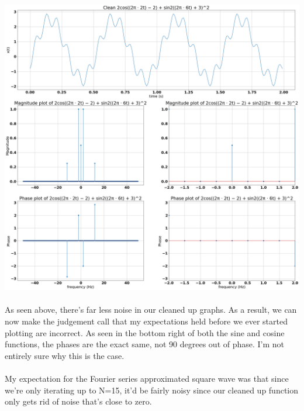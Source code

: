 \documentclass[12pt]{report}
\begin{document}
    \includegraphics[scale=0.25]{Figure 2022-03-22 205111 (5).png}
    
    \paragraph{} As seen above, there's far less noise in our cleaned up graphs. As a result, we can now make the judgement call that my expectations held before we ever started plotting are incorrect. As seen in the bottom right of both the sine and cosine functions, the phases are the exact same, not 90 degrees out of phase. I'm not entirely sure why this is the case. 
    
    \paragraph{} My expectation for the Fourier series approximated square wave was that since we're only iterating up to N=15, it'd be fairly noisy since our cleaned up function only gets rid of noise that's close to zero.  
    
\end{document}

